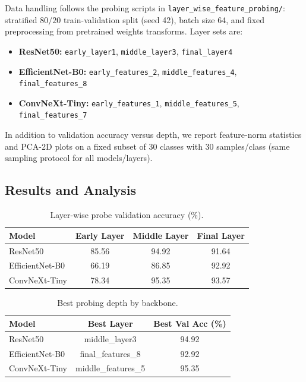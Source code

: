 \documentclass[11pt,a4paper]{article}
\begin{document}
Data handling follows the probing scripts in \texttt{layer\_wise\_feature\_probing/}: stratified $80/20$ train-validation split (seed 42), batch size 64, and fixed preprocessing from pretrained weights transforms. Layer sets are:
\begin{itemize}
	\item \textbf{ResNet50:} \texttt{early\_layer1}, \texttt{middle\_layer3}, \texttt{final\_layer4}
	\item \textbf{EfficientNet-B0:} \texttt{early\_features\_2}, \texttt{middle\_features\_4}, \texttt{final\_features\_8}
	\item \textbf{ConvNeXt-Tiny:} \texttt{early\_features\_1}, \texttt{middle\_features\_5}, \texttt{final\_features\_7}
\end{itemize}

In addition to validation accuracy versus depth, we report feature-norm statistics and PCA-2D plots on a fixed subset of 30 classes with 30 samples/class (same sampling protocol for all models/layers).

\subsection{Results and Analysis}
\begin{table}[H]
	\centering
	\caption{Layer-wise probe validation accuracy (\%).}
	\begin{tabular}{lccc}
		\toprule
		Model & Early Layer & Middle Layer & Final Layer \\
		\midrule
		ResNet50 & 85.56 & 94.92 & 91.64 \\
		EfficientNet-B0 & 66.19 & 86.85 & 92.92 \\
		ConvNeXt-Tiny & 78.34 & 95.35 & 93.57 \\
		\bottomrule
	\end{tabular}
\end{table}

\begin{table}[H]
	\centering
	\caption{Best probing depth by backbone.}
	\begin{tabular}{lcc}
		\toprule
		Model & Best Layer & Best Val Acc (\%) \\
		\midrule
		ResNet50 & middle\_layer3 & 94.92 \\
		EfficientNet-B0 & final\_features\_8 & 92.92 \\
		ConvNeXt-Tiny & middle\_features\_5 & 95.35 \\
		\bottomrule
	\end{tabular}
\end{table}
\end{document}
